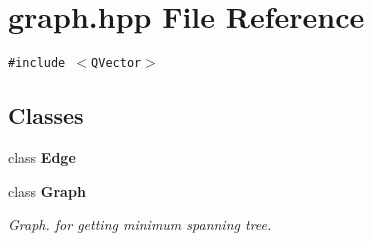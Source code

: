 \section{graph.hpp File Reference}
\label{graph_8hpp}
{\tt \#include $<$QVector$>$}\par
\subsection*{Classes}
\begin{CompactItemize}
\item 
class {\bf Edge}
\item 
class {\bf Graph}
\begin{CompactList}\small\item\em Graph. for getting minimum spanning tree. \item\end{CompactList}\end{CompactItemize}
